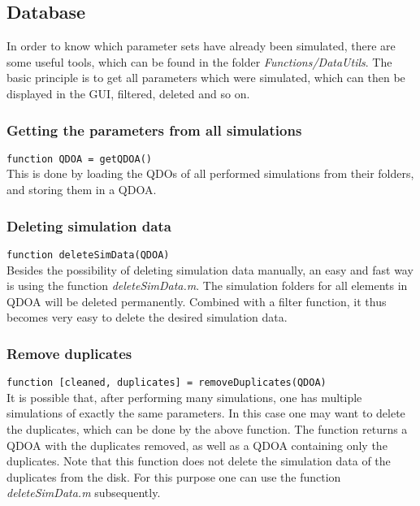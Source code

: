 \subsection{Database}
In order to know which parameter sets have already been simulated, there are some useful tools, which can be found in the folder \textit{Functions/DataUtils}. The basic principle is to get all parameters which were simulated, which can then be displayed in the GUI, filtered, deleted and so on.

\subsubsection{Getting the parameters from all simulations}

\lstinline{function QDOA = getQDOA()}\\

This is done by loading the QDOs of all performed simulations from their folders, and storing them in a QDOA. 

\subsubsection{Deleting simulation data}

\lstinline{function deleteSimData(QDOA)}\\

Besides the possibility of deleting simulation data manually, an easy and fast way is using the function \textit{deleteSimData.m}. The simulation folders for all elements in QDOA will be deleted permanently. Combined with a filter function, it thus becomes very easy to delete the desired simulation data.

\subsubsection{Remove duplicates}
\lstinline{function [cleaned, duplicates] = removeDuplicates(QDOA)}\\

It is possible that, after performing many simulations, one has multiple simulations of exactly the same parameters. In this case one may want to delete the duplicates, which can be done by the above function. The function returns a QDOA with the duplicates removed, as well as a QDOA containing only the duplicates. Note that this function does not delete the simulation data of the duplicates from the disk. For this purpose one can use the function \textit{deleteSimData.m} subsequently.

